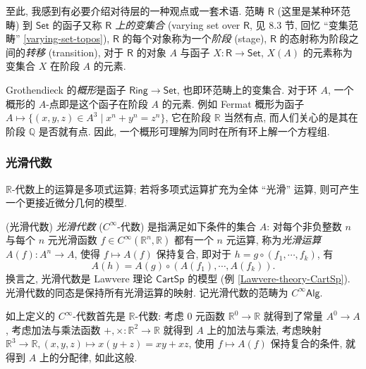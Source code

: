 \begin{remark}
	{}
	至此, 我感到有必要介绍对待层的一种观点或一套术语. 范畴 $\mathsf{R}$ (这里是某种环范畴) 到 $\mathsf {Set}$ 的函子又称 \emph{$\mathsf {R}$ 上的变集合} (varying set over $\mathsf R$, 见 \cite{SDG-Lavendhomme} 8.3 节, 回忆 ``变集范畴'' \ref{varying-set-topos}),
	$\mathsf R$ 的每个对象称为一个\emph{阶段} (stage), $\mathsf R$ 的态射称为阶段之间的\emph{转移} (transition), 对于 $\mathsf R$ 的对象 $A$ 与函子 $X\colon \mathsf R\to\mathsf {Set}$, $X(A)$ 的元素称为变集合 $X$ 在阶段 $A$ 的元素.
	
	Grothendieck 的\emph{概形}是函子 $\mathsf {Ring}\to\mathsf {Set}$, 也即环范畴上的变集合. 对于环 $A$, 一个概形的 $A$-点即是这个函子在阶段 $A$ 的元素. 例如 Fermat 概形为函子 $A\mapsto \{(x,y,z)\in A^3\mid x^n+y^n=z^n\}$, 它在阶段 $\mathbb{R}$ 当然有点, 而人们关心的是其在阶段 $\mathbb{Q}$ 是否就有点. 因此, 一个概形可理解为同时在所有环上解一个方程组.
\end{remark}



\subsubsection{光滑代数}

$\mathbb{R}$-代数上的运算是多项式运算; 若将多项式运算扩充为全体 ``光滑'' 运算, 则可产生一个更接近微分几何的模型.

\begin{definition}
	{(光滑代数)}
	\emph{光滑代数} ($C^\infty$-代数) 是指满足如下条件的集合 $A$: 对每个非负整数 $n$ 与每个 $n$ 元光滑函数 $f\in C^\infty (\mathbb{R}^n,\mathbb{R})$ 都有一个 $n$ 元运算, 称为\emph{光滑运算} $A(f)\colon A^n\to A$,
	使得 $f\mapsto A(f)$ 保持复合, 即对于 $h = g \circ (f_1,\cdots,f_k)$, 有
	$$A(h) = A(g) \circ (A(f_1),\cdots,A(f_k)).$$ 换言之, 光滑代数是 Lawvere 理论 $\mathsf {CartSp}$ 的模型 (例 \ref{Lawvere-theory-CartSp}). 光滑代数的同态是保持所有光滑运算的映射. 记光滑代数的范畴为 $C^\infty\mathsf{Alg}$.
\end{definition}

\begin{remark}
	{}
	如上定义的 $C^\infty$-代数首先是 $\mathbb{R}$-代数: 考虑 $0$ 元函数 $\mathbb{R}^0\to \mathbb{R}$ 就得到了常量 $A^0\to A$,
	考虑加法与乘法函数 $+,\times\colon \mathbb{R}^2\to \mathbb{R}$ 就得到 $A$ 上的加法与乘法, 考虑映射 $\mathbb{R}^3\to \mathbb{R}, (x,y,z)\mapsto x(y+z) = xy+xz$, 使用 $f\mapsto A(f)$ 保持复合的条件, 就得到 $A$ 上的分配律, 如此这般.
\end{remark}

